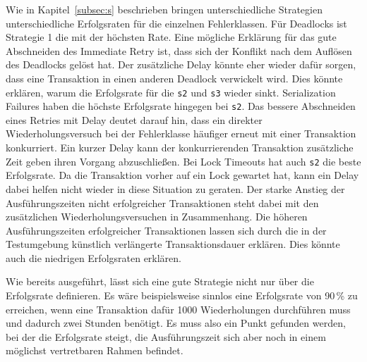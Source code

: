 Wie in Kapitel~\ref{subsec:s} beschrieben bringen unterschiedliche Strategien unterschiedliche Erfolgsraten für die
einzelnen Fehlerklassen.
Für Deadlocks ist Strategie 1 die mit der höchsten Rate.
Eine mögliche Erklärung für das gute Abschneiden des Immediate Retry ist, dass sich der Konflikt nach dem Auflösen
des Deadlocks gelöst hat.
Der zusätzliche Delay könnte eher wieder dafür sorgen, dass eine Transaktion in einen anderen Deadlock verwickelt wird.
Dies könnte erklären, warum die Erfolgsrate für die \texttt{s2} und \texttt{s3} wieder sinkt.
Serialization Failures haben die höchste Erfolgsrate hingegen bei \texttt{s2}.
Das bessere Abschneiden eines Retries mit Delay deutet darauf hin, dass ein direkter Wiederholungsversuch bei der
Fehlerklasse häufiger erneut mit einer Transaktion konkurriert.
Ein kurzer Delay kann der konkurrierenden Transaktion zusätzliche Zeit geben ihren Vorgang abzuschließen.
Bei Lock Timeouts hat auch \texttt{s2} die beste Erfolgsrate.
Da die Transaktion vorher auf ein Lock gewartet hat, kann ein Delay dabei helfen nicht wieder in diese Situation zu
geraten.
Der starke Anstieg der Ausführungszeiten nicht erfolgreicher Transaktionen steht dabei mit den zusätzlichen
Wiederholungsversuchen in Zusammenhang.
Die höheren Ausführungszeiten erfolgreicher Transaktionen lassen sich durch die in der Testumgebung künstlich
verlängerte Transaktionsdauer erklären.
Dies könnte auch die niedrigen Erfolgsraten erklären.

Wie bereits ausgeführt, lässt sich eine gute Strategie nicht nur über die Erfolgsrate definieren.
Es wäre beispielsweise sinnlos eine Erfolgsrate von 90\,\% zu erreichen, wenn eine Transaktion dafür 1000 Wiederholungen
durchführen muss und dadurch zwei Stunden benötigt.
Es muss also ein Punkt gefunden werden, bei der die Erfolgsrate steigt, die Ausführungszeit sich aber noch in einem
möglichst vertretbaren Rahmen befindet.



